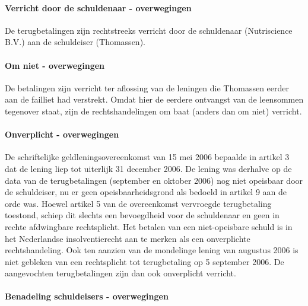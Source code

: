 \documentclass[
  dutch,
  a4paper,
]{article}
\begin{document}
\paragraph{Verricht door de schuldenaar - overwegingen}\label{verricht-door-de-schuldenaar---overwegingen-80}

De terugbetalingen zijn rechtstreeks verricht door de schuldenaar (Nutriscience B.V.) aan de schuldeiser (Thomassen).

\paragraph{Om niet - overwegingen}\label{om-niet---overwegingen-80}

De betalingen zijn verricht ter aflossing van de leningen die Thomassen eerder aan de failliet had verstrekt. Omdat hier de eerdere ontvangst van de leensommen tegenover staat, zijn de rechtshandelingen om baat (anders dan om niet) verricht.

\paragraph{Onverplicht - overwegingen}\label{onverplicht---overwegingen-80}

De schriftelijke geldleningsovereenkomst van 15 mei 2006 bepaalde in artikel 3 dat de lening liep tot uiterlijk 31 december 2006. De lening was derhalve op de data van de terugbetalingen (september en oktober 2006) nog niet opeisbaar door de schuldeiser, nu er geen opeisbaarheidsgrond als bedoeld in artikel 9 aan de orde was. Hoewel artikel 5 van de overeenkomst vervroegde terugbetaling toestond, schiep dit slechts een bevoegdheid voor de schuldenaar en geen in rechte afdwingbare rechtsplicht. Het betalen van een niet-opeisbare schuld is in het Nederlandse insolventierecht aan te merken als een onverplichte rechtshandeling. Ook ten aanzien van de mondelinge lening van augustus 2006 is niet gebleken van een rechtsplicht tot terugbetaling op 5 september 2006. De aangevochten terugbetalingen zijn dan ook onverplicht verricht.

\paragraph{Benadeling schuldeisers - overwegingen}\label{benadeling-schuldeisers---overwegingen-80}
\end{document}
